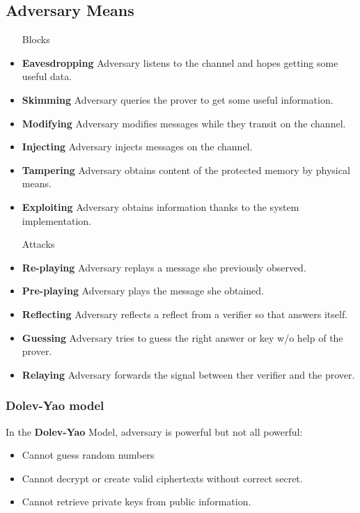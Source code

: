 \subsection{Adversary Means}
\begin{itemize}
    \item[Blocks]
\item\textbf{Eavesdropping} Adversary listens to the channel and hopes getting some
        useful data.
    \item\textbf{Skimming} Adversary queries the prover to get some useful information.
    \item\textbf{Modifying} Adversary modifies messages while they transit on the
        channel.
    \item\textbf{Injecting} Adversary injects messages on the channel.
    \item\textbf{Tampering} Adversary obtains content of the protected memory by
        physical means.
    \item\textbf{Exploiting} Adversary obtains information thanks to the system
        implementation.

    \item[Attacks]
    \item\textbf{Re-playing} Adversary replays a message she previously observed.
    \item\textbf{Pre-playing} Adversary plays the message she obtained.
    \item\textbf{Reflecting} Adversary reflects a reflect from a verifier so that
        answers itself.
    \item\textbf{Guessing} Adversary tries to guess the right answer or key w/o help of
        the prover.
    \item\textbf{Relaying} Adversary forwards the signal between ther verifier and the
        prover.
\end{itemize}

\subsubsection{Dolev-Yao model}
In the \textbf{Dolev-Yao} Model, adversary
is powerful but not all powerful: 
\begin{itemize}
    \item Cannot guess random numbers
    \item Cannot decrypt or create valid ciphertexts without correct secret.
    \item Cannot retrieve private keys from public information.
\end{itemize}

